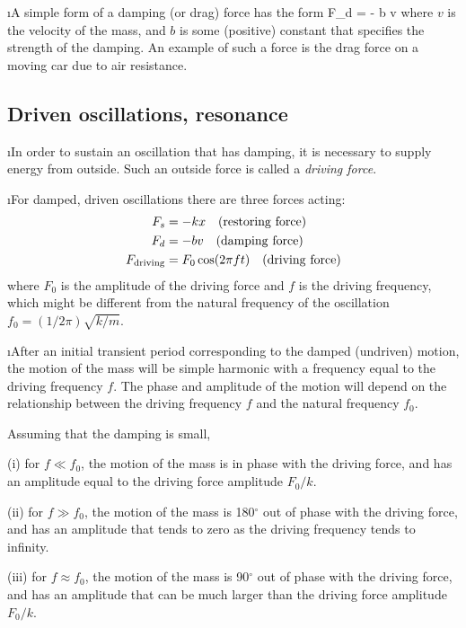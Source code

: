 \i A simple form of a damping (or drag) force has the form
%
\be
F_d = - b v
\ee
%
where $v$ is the velocity of the mass, and $b$ is some (positive) 
constant that specifies the strength of the damping.
An example of such a force is the drag force on a moving car 
due to air resistance.

\ei

\subsection{Driven oscillations, resonance}

\bi

\i In order to sustain an oscillation that has damping, it 
is necessary to supply energy from outside.
Such an outside force is called a {\em driving force}.

\i For damped, driven oscillations there are three 
forces acting:
%
\begin{align}
F_s&=-kx
\quad
({\rm restoring\ force})\\
F_d&=-bv
\quad
({\rm damping\ force})\\
F_{\rm driving}&=F_0\cos(2\pi f t)
\quad
({\rm driving\ force})
\end{align}
%
where $F_0$ is the amplitude of the driving force and 
$f$ is the driving frequency, which might be different 
from the natural frequency of the oscillation 
$f_0= (1/2\pi)\sqrt{k/m}$.

\i After an initial transient period corresponding to
the damped (undriven) motion, the motion of the
mass will be simple harmonic with a frequency equal to the driving 
frequency $f$.
The phase and amplitude of the motion will depend on the
relationship between the driving
frequency $f$ and the natural frequency $f_0$.

Assuming that the damping is small, 

(i) for $f\ll f_0$, the motion of the mass is 
in phase with the driving force, and has an amplitude equal 
to the driving force amplitude $F_0/k$.

(ii) for $f\gg f_0$, the motion of the mass is 
180$^\circ$ out of phase with the driving force, and
has an amplitude that tends to zero as the driving frequency
tends to infinity.

(iii) for $f\approx f_0$, the motion of the mass is
90$^\circ$ out of phase with the driving force,
and has an amplitude that can be much larger than the
driving force amplitude $F_0/k$. 

